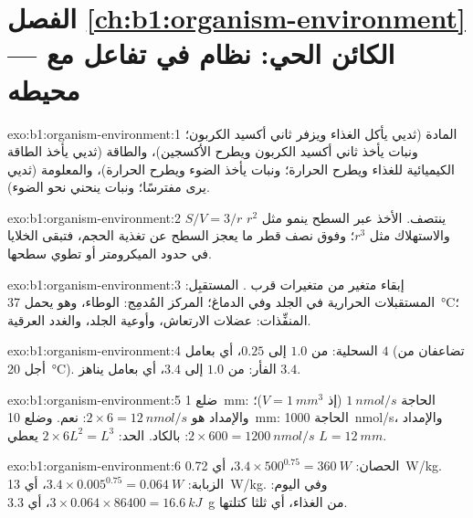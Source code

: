 \section*{الفصل \ref{ch:b1:organism-environment} --- الكائن الحي: نظام في تفاعل مع محيطه}

\begin{solution}{exo:b1:organism-environment:1}
المادة (ثديي يأكل الغذاء ويزفر ثاني أكسيد الكربون؛ ونبات يأخذ ثاني
أكسيد الكربون ويطرح الأكسجين)، والطاقة (ثديي يأخذ الطاقة الكيميائية
للغذاء ويطرح الحرارة؛ ونبات يأخذ الضوء ويطرح الحرارة)، والمعلومة
(ثديي يرى مفترسًا؛ ونبات ينحني نحو الضوء).
\end{solution}

\begin{solution}{exo:b1:organism-environment:2}
$S/V = 3/r$ ينتصف. الأخذ عبر السطح ينمو مثل $r^2$ والاستهلاك مثل
$r^3$؛ وفوق نصف قطر ما يعجز السطح عن تغذية الحجم، فتبقى الخلايا في
حدود الميكرومتر أو تطوي سطحها.
\end{solution}

\begin{solution}{exo:b1:organism-environment:3}
إبقاء متغير من متغيرات  قرب  . المستقبِل: المستقبلات الحرارية في الجلد وفي الدماغ؛ المركز
المُدمِج: الوطاء، وهو يحمل  \qty{37}{\celsius}؛
المنفِّذات: عضلات الارتعاش، وأوعية الجلد، والغدد العرقية.
\end{solution}

\begin{solution}{exo:b1:organism-environment:4}
السحلية: من $1.0$ إلى $0.25$، أي بعامل $4$ (تضاعفان من أجل
\qty{20}{\celsius}). الفأر: من $1.0$ إلى $3.4$، أي بعامل يناهز
$3.4$.
\end{solution}

\begin{solution}{exo:b1:organism-environment:5}
ضلع \qty{1}{mm}: الحاجة $\qty{1}{nmol/s}$ (إذ $V = \qty{1}{mm^3}$)؛
والإمداد هو $2\times 6 = \qty{12}{nmol/s}$: نعم. وضلع \qty{10}{mm}:
الحاجة \qty{1000}{nmol/s}، والإمداد
$2\times 600 = \qty{1200}{nmol/s}$: بالكاد. الحد:
$2\times 6L^2 = L^3$ يعطي $L = \qty{12}{mm}$.
\end{solution}

\begin{solution}{exo:b1:organism-environment:6}
الحصان: $3.4\times 500^{0.75} = \qty{360}{W}$، أي \qty{0.72}{W/kg}.
الزبابة: $3.4\times 0.005^{0.75} = \qty{0.064}{W}$، أي
\qty{13}{W/kg}. وفي اليوم:
$3\times 0.064\times 86400 = \qty{16.6}{kJ}$، أي \qty{3.3}{g} من
الغذاء، أي ثلثا كتلتها.
\end{solution}

